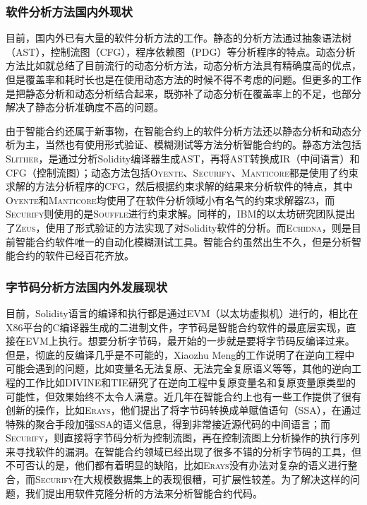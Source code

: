\subsubsection{软件分析方法国内外现状}

目前，国内外已有大量的软件分析方法的工作。静态的分析方法通过抽象语法树（AST），控制流图（CFG），程序依赖图（PDG）等分析程序的特点。动态分析方法比如\cite{survey-dynamic}就总结了目前流行的动态分析方法，动态分析方法具有精确度高的优点，但是覆盖率和耗时长也是在使用动态方法的时候不得不考虑的问题。但更多的工作是把静态分析和动态分析结合起来，既弥补了动态分析在覆盖率上的不足，也部分解决了静态分析准确度不高的问题。

由于智能合约还属于新事物，在智能合约上的软件分析方法还以静态分析和动态分析为主，当然也有使用形式验证、模糊测试等方法分析智能合约的。静态方法包括\textsc{Slither}\cite{slither}，是通过分析Solidity编译器生成AST，再将AST转换成IR（中间语言）和CFG（控制流图）；动态方法包括\textsc{Oyente}\cite{oyente}、\textsc{Securify}\cite{securify}、\textsc{Manticore}\cite{manticore}都是使用了约束求解的方法分析程序的CFG，然后根据约束求解的结果来分析软件的特点，其中\textsc{Oyente}和\textsc{Manticore}均使用了在软件分析领域小有名气的约束求解器Z3\cite{z3}，而\textsc{Securify}则使用的是\textsc{Souffle}\cite{souffle}进行约束求解。同样的，IBM的以太坊研究团队提出了\textsc{Zeus}\cite{zeus}，使用了形式验证的方法实现了对Solidity软件的分析。而\textsc{Echidna}\cite{echidna}，则是目前智能合约软件唯一的自动化模糊测试工具。智能合约虽然出生不久，但是分析智能合约的软件已经百花齐放。

\subsubsection{字节码分析方法国内外发展现状}

目前，Solidity语言的编译和执行都是通过EVM（以太坊虚拟机）进行的，相比在X86平台的C编译器生成的二进制文件，字节码是智能合约软件的最底层实现，直接在EVM上执行。想要分析字节码，最开始的一步就是要将字节码反编译过来。但是，彻底的反编译几乎是不可能的，Xiaozhu Meng的工作\cite{binary-not-ez}说明了在逆向工程中可能会遇到的问题，比如变量名无法复原、无法完全复原语义等等，其他的逆向工程的工作比如\textsc{DIVINE}\cite{divine}和\textsc{TIE}\cite{tie}研究了在逆向工程中复原变量名和复原变量原类型的可能性，但效果始终不太令人满意。近几年在智能合约上也有一些工作提供了很有创新的操作，比如\textsc{Erays}\cite{erays}，他们提出了将字节码转换成单赋值语句（SSA），在通过特殊的聚合手段加强SSA的语义信息，得到非常接近源代码的中间语言；而\textsc{Securify}\cite{securify}，则直接将字节码分析为控制流图，再在控制流图上分析操作的执行序列来寻找软件的漏洞。在智能合约领域已经出现了很多不错的分析字节码的工具，但不可否认的是，他们都有着明显的缺陷，比如\textsc{Erays}没有办法对复杂的语义进行整合，而\textsc{Securify}在大规模数据集上的表现很糟，可扩展性较差。为了解决这样的问题，我们提出用软件克隆分析的方法来分析智能合约代码。

